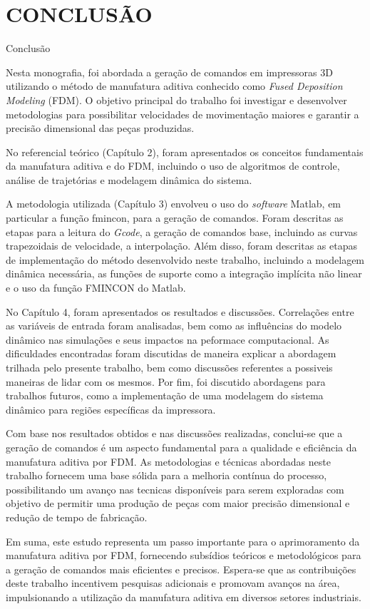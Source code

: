 \chapter{CONCLUSÃO}
Conclusão

Nesta monografia, foi abordada a geração de comandos em impressoras 3D utilizando o método de manufatura aditiva conhecido como \textit{Fused Deposition Modeling} (FDM). O objetivo principal do trabalho foi investigar e desenvolver metodologias para possibilitar velocidades de movimentação maiores e garantir a precisão dimensional das peças produzidas.

No referencial teórico (Capítulo 2), foram apresentados os conceitos fundamentais da manufatura aditiva e do FDM, incluindo o uso de algoritmos de controle, análise de trajetórias e modelagem dinâmica do sistema.

A metodologia utilizada (Capítulo 3) envolveu o uso do \textit{software} Matlab, em particular a função fmincon, para a geração de comandos. Foram descritas as etapas para a leitura do \textit{Gcode}, a geração de comandos base, incluindo as curvas trapezoidais de velocidade, a interpolação. Além disso, foram descritas as etapas de implementação do método desenvolvido neste trabalho, incluindo a modelagem dinâmica necessária, as funções de suporte como a integração implícita não linear e o uso da função FMINCON do Matlab.

No Capítulo 4, foram apresentados os resultados e discussões. Correlações entre as variáveis de entrada foram analisadas, bem como as influências do modelo dinâmico nas simulações e seus impactos na peformace computacional. As dificuldades encontradas foram discutidas de maneira explicar a abordagem trilhada pelo presente trabalho, bem como discussões referentes a possiveis maneiras de lidar com os mesmos. Por fim, foi discutido abordagens para trabalhos futuros, como a implementação de uma modelagem do sistema dinâmico para regiões específicas da impressora.

Com base nos resultados obtidos e nas discussões realizadas, conclui-se que a geração de comandos é um aspecto fundamental para a qualidade e eficiência da manufatura aditiva por FDM. As metodologias e técnicas abordadas neste trabalho fornecem uma base sólida para a melhoria contínua do processo, possibilitando um avanço nas tecnicas disponíveis para serem exploradas com objetivo de permitir uma produção de peças com maior precisão dimensional e redução de tempo de fabricação.

Em suma, este estudo representa um passo importante para o aprimoramento da manufatura aditiva por FDM, fornecendo subsídios teóricos e metodológicos para a geração de comandos mais eficientes e precisos. Espera-se que as contribuições deste trabalho incentivem pesquisas adicionais e promovam avanços na área, impulsionando a utilização da manufatura aditiva em diversos setores industriais.
